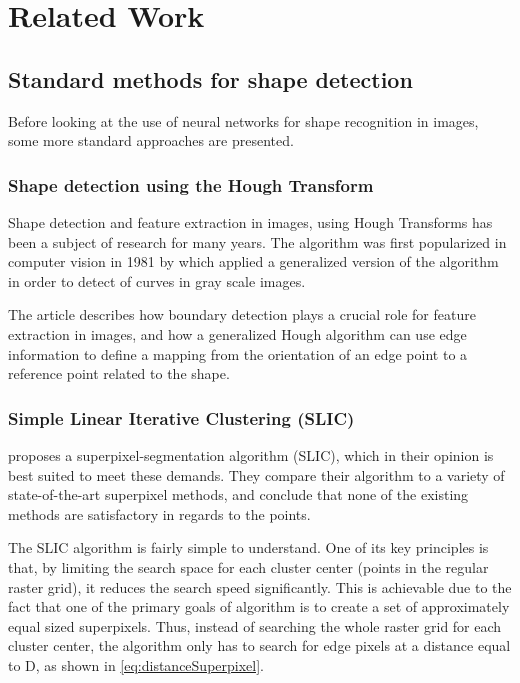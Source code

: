 \chapter{Related Work}

\section{Standard methods for shape detection}
Before looking at the use of neural networks for shape recognition in images, some more standard approaches are presented.

\subsection{Shape detection using the Hough Transform}
Shape detection and feature extraction in images, using Hough Transforms has been a subject of research for many years. The algorithm was first popularized in computer vision in 1981 by \cite{Ballard1981} which applied a generalized version of the algorithm in order to detect of curves in gray scale images.

The article describes how boundary detection plays a crucial role for feature extraction in images, and how a generalized Hough algorithm can use edge information to define a mapping from the orientation of an edge point to a reference point related to the shape.

\subsection{Simple Linear Iterative Clustering (SLIC)}
\cite{Achanta2012} proposes a superpixel-segmentation algorithm (SLIC), which in their opinion is best suited to meet these demands. They compare their algorithm to a variety of state-of-the-art superpixel methods, and conclude that none of the existing methods are satisfactory in regards to the points.

The SLIC algorithm is fairly simple to understand. One of its key principles is that, by limiting the search space for each cluster center (points in the regular raster grid), it reduces the search speed significantly. This is achievable due to the fact that one of the primary goals of algorithm is to create a set of approximately equal sized superpixels. Thus, instead of searching the whole raster grid for each cluster center, the algorithm only has to search for edge pixels at a distance equal to D, as shown in \autoref{eq:distanceSuperpixel}.

